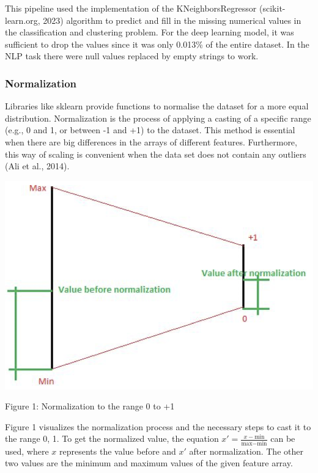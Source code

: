 \documentclass{article}
\begin{document}
\begin{multicols}{2}
This pipeline used the implementation of the KNeighborsRegressor (scikit-learn.org, 2023) algorithm to predict and fill in the missing numerical values in the classification and clustering problem. For the deep learning model, it was sufficient to drop the values since it was only 0.013\% of the entire dataset. In the NLP task there were null values replaced by empty strings to work.

\subsubsection{Normalization}

Libraries like sklearn provide functions to normalise the dataset for a more equal distribution. Normalization is the process of applying a casting of a specific range (e.g., 0 and 1, or between -1 and +1) to the dataset. This method is essential when there are big differences in the arrays of different features. Furthermore, this way of scaling is convenient when the data set does not contain any outliers (Ali et al., 2014).

\includegraphics[scale=.3]{img/norm1.png}

{\small
  Figure 1: Normalization to the range 0 to +1
  \par
  \vspace{6pt}
}


Figure 1 visualizes the normalization process and the necessary steps to cast it to the range 0, 1. To get the normalized value, the equation \(x' = \frac{x - \text{min}}{\text{max} - \text{min}}\) can be used, where \(x\) represents the value before and \(x'\) after normalization. The other two values are the minimum and maximum values of the given feature array.


\end{multicols}
\end{document}
